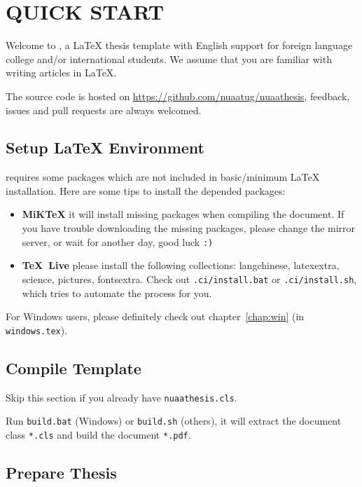 
\chapter{QUICK START}

Welcome to \nuaathesis,
a \LaTeX{} thesis template with English support for foreign language college and/or international students.
We assume that you are familiar with writing articles in \LaTeX.

The source code is hosted on \url{https://github.com/nuaatug/nuaathesis},
feedback, issues and pull requests are always welcomed.

\section{Setup \LaTeX{} Environment}

\nuaathesis{} requires some packages which are not included in basic/minimum \LaTeX{} installation.
Here are some tips to install the depended packages:

\begin{itemize}
\item\textbf{MiK\TeX} it will install missing packages when compiling the document.
If you have trouble downloading the missing packages, please change the mirror server,
or wait for another day, good luck \verb|:)|
\item\textbf{\TeX~Live} please install the following collections: langchinese, latexextra, science, pictures, fontsextra.
Check out \verb|.ci/install.bat| or \verb|.ci/install.sh|, which tries to automate the process for you.
\end{itemize}

For Windows users, please definitely check out chapter~\ref{chap:win} (in \verb|windows.tex|).

\section{Compile Template}

Skip this section if you already have \verb|nuaathesis.cls|.

Run \verb|build.bat| (Windows) or \verb|build.sh| (others),
it will extract the document class \verb|*.cls|
and build the document \verb|*.pdf|.

\section{Prepare Thesis}

